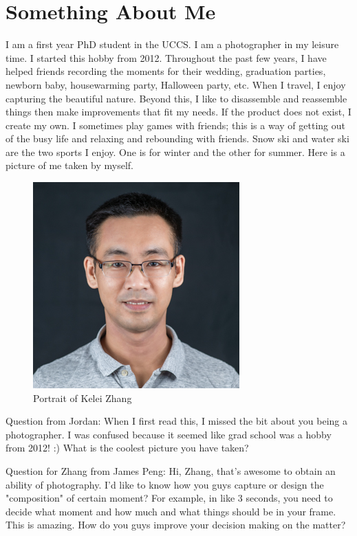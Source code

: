 \section{Something About Me}
I am a first year PhD student in the UCCS. I am a photographer in my leisure time. I started this hobby from 2012. Throughout the past few years, I have helped friends recording the moments for their wedding, graduation parties, newborn baby, housewarming party, Halloween party, etc. When I travel, I enjoy capturing the beautiful nature. Beyond this, I like to disassemble and reassemble things then make improvements that fit my needs. If the product does not exist, I create my own. I sometimes play games with friends; this is a way of getting out of the busy life and relaxing and rebounding with friends. Snow ski and water ski are the two sports I enjoy. One is for winter and the other for summer. Here is a picture of me taken by myself.

\begin{figure}[htbp]
\centerline{\includegraphics{zhang.jpg}}
\caption{Portrait of Kelei Zhang}
\label{fig}
\end{figure}

Question from Jordan: When I first read this, I missed the bit about you being a photographer. I was confused because it seemed like grad school was a hobby from 2012! :) What is the coolest picture you have taken?

Question for Zhang from James Peng: Hi, Zhang, that's awesome to obtain an ability of photography. I'd like to know how you guys capture or design the "composition" of certain moment? For example, in like 3 seconds, you need to decide what moment and how much and what things should be in your frame. This is amazing. How do you guys improve your decision making on the matter? 